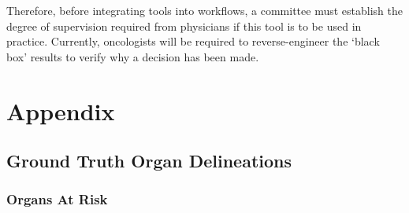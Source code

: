 \documentclass[12pt,twoside]{report}
\begin{document}
Therefore, before integrating tools into workflows, a committee must establish the degree of supervision required from physicians if this tool is to be used in practice. Currently, oncologists will be required to reverse-engineer the `black box' results to verify why a decision has been made. 


\clearpage

\appendix

\chapter{Appendix}

\section{Ground Truth Organ Delineations}

\subsection{Organs At Risk}
\end{document}
